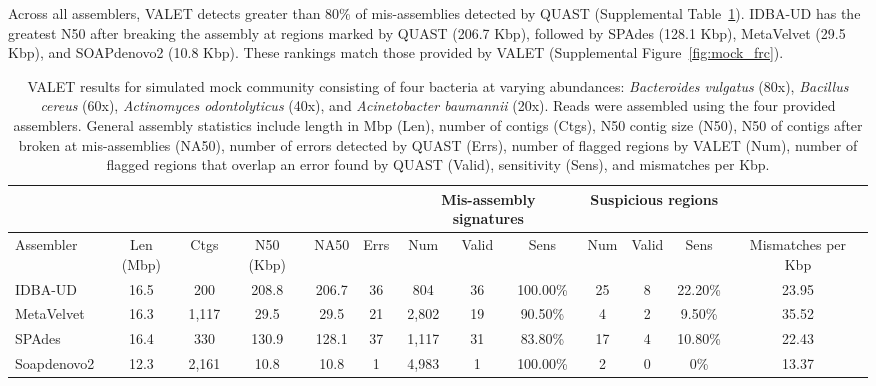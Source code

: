 \documentclass{article}
\begin{document}
Across all assemblers, VALET detects greater than 80\% of mis-assemblies detected by QUAST (Supplemental Table~\ref{simulated_community}).%
IDBA-UD has the greatest N50 after breaking the assembly at regions marked by QUAST (206.7 Kbp), followed by SPAdes (128.1 Kbp), MetaVelvet (29.5 Kbp), and SOAPdenovo2 (10.8 Kbp).
These rankings match those provided by VALET (Supplemental Figure~\ref{fig:mock_frc}).

\begin{landscape}
\begin{table}
\centering
\footnotesize
\begin{tabular}{|l|c|c|c|c|c|c|c|c|c|c|c|c|}
  \hline
  \multicolumn{6}{|c}{} & \multicolumn{3}{|c|}{Mis-assembly signatures} & \multicolumn{3}{c|}{Suspicious regions}   &  \\
  \hline
  Assembler   & Len (Mbp) & Ctgs  & N50 (Kbp) & NA50  & Errs & Num   & Valid & Sens     & Num & Valid & Sens    & Mismatches per Kbp \\
  \hline
  IDBA-UD     & 16.5      & 200   & 208.8     & 206.7 & 36   & 804   & 36    & 100.00\% & 25  & 8     & 22.20\% & 23.95              \\
  MetaVelvet  & 16.3      & 1,117 & 29.5      & 29.5  & 21   & 2,802 & 19    & 90.50\%  & 4   & 2     & 9.50\%  & 35.52              \\
  SPAdes      & 16.4      & 330   & 130.9     & 128.1 & 37   & 1,117 & 31    & 83.80\%  & 17  & 4     & 10.80\% & 22.43              \\
  Soapdenovo2 & 12.3      & 2,161 & 10.8      & 10.8  & 1    & 4,983 & 1     & 100.00\% & 2   & 0     & 0\%     & 13.37 \\
  \hline
\end{tabular}
\caption[VALET results for simulated mock community]{VALET results for simulated mock community consisting of four bacteria at varying abundances: \emph{Bacteroides vulgatus} (80x), \emph{Bacillus cereus} (60x), \emph{Actinomyces odontolyticus} (40x), and \emph{Acinetobacter baumannii} (20x). Reads were assembled using the four provided assemblers. General assembly statistics include length in Mbp (Len), number of contigs (Ctgs), N50 contig size (N50), N50 of contigs after broken at mis-assemblies (NA50), number of errors detected by QUAST (Errs), number of flagged regions by VALET (Num), number of flagged regions that overlap an error found by QUAST (Valid), sensitivity (Sens), and mismatches per Kbp.}
\label{simulated_community}
\end{table}


\end{landscape}
\end{document}
